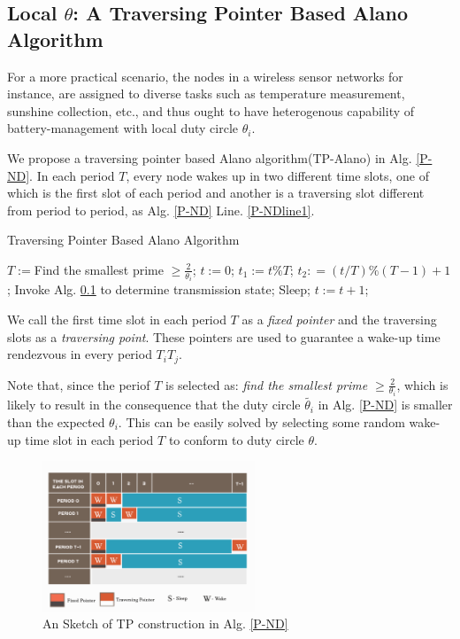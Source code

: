 


\subsection{Local $\theta$: A Traversing Pointer Based Alano Algorithm}


For a more practical scenario, the nodes in a wireless sensor networks 
for instance, are assigned to diverse tasks such as temperature measurement,
sunshine collection, etc., and thus ought to have heterogenous capability of
battery-management with local duty circle $\theta_i$.

We propose a traversing pointer based Alano algorithm(TP-Alano) in Alg. \ref{P-ND}.
In each period $T$, every node wakes up in two different time slots, one of which is the
first slot of each period and another is a traversing slot different from period to period, 
as Alg. \ref{P-ND} Line. \ref{P-NDline1}.  

\begin{algorithm}
\caption{Traversing Pointer Based Alano Algorithm}
\label{P-ND}
\begin{algorithmic}[1]
\STATE $T := $Find the smallest prime $\geq \frac{2}{\theta_i}$;
\STATE $t := 0$;
	\STATE $t_1 := t \% T$;
	\STATE $t_2 : =( t / T ) \% (T - 1) +1$;\label{P-NDline1}
    		\STATE Invoke Alg. \ref{} to determine transmission state;
	\ELSE
    		\STATE Sleep;
	\ENDIF
	\STATE $t := t + 1$;
\ENDWHILE
\end{algorithmic}
\end{algorithm}

We call the first time slot in each period $T$ as a \emph{fixed pointer} and the traversing
slots as a \emph{traversing point}. These pointers are used to guarantee a wake-up time rendezvous
in every period $T_iT_j$.
 
Note that, since the periof $T$ is selected as: 
\emph{find the smallest prime $\geq \frac{2}{\theta_i}$},
which is likely to result in the consequence that the duty 
circle $\widetilde{\theta_i}$ in Alg. \ref{P-ND} is smaller than the expected
$\theta_i$. This can be easily solved by selecting some random wake-up time slot 
in each period $T$ to conform to duty circle $\theta$.

\begin{figure}[htb]
\centering
\includegraphics[width=2.5in]{./Figure/TP}
\caption{An Sketch of TP construction in Alg. \ref{P-ND}}
\label{matrix}
\end{figure}

